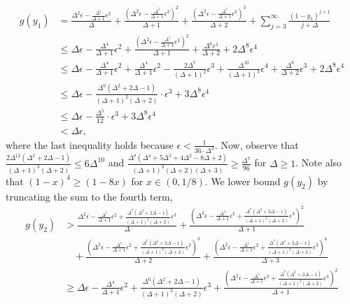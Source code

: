 \documentclass[11pt]{article}
\begin{document}
\begin{appendixproof}
\begin{align*}
g(y_1) &= \frac{\Delta^2\epsilon - \frac{\Delta^5}{\Delta+1}\epsilon^2}{\Delta} + \frac{\left(\Delta^2\epsilon - \frac{\Delta^5}{\Delta+1}\epsilon^2\right)^2}{\Delta+1} + \frac{\left(\Delta^2\epsilon - \frac{\Delta^5}{\Delta+1}\epsilon^2\right)^3}{\Delta+2} + \sum_{j=3}^\infty \frac{(1-y_1)^{j+1}}{j+\Delta}\\ 
&\leq \Delta\epsilon - \frac{\Delta^4}{\Delta+1}\epsilon^2 + \frac{\left(\Delta^2\epsilon - \frac{\Delta^5}{\Delta+1}\epsilon^2\right)^2}{\Delta+1} + \frac{\Delta^6\epsilon^3}{\Delta+2} + 2\Delta^8 \epsilon^4 \\
&\leq \Delta\epsilon - \frac{\Delta^4}{\Delta+1}\epsilon^2 + \frac{\Delta^4}{\Delta+1}\epsilon^2 - \frac{2\Delta^7}{(\Delta+1)^2}\epsilon^3 + \frac{\Delta^{10}}{(\Delta+1)^3} \epsilon^4 + \frac{\Delta^6}{\Delta+2}\epsilon^3
+ 2\Delta^8 \epsilon^4 \\ 
& \leq\Delta\epsilon - \frac{\Delta^6(\Delta^2+2\Delta-1)}{(\Delta+1)^2(\Delta+2)} \cdot \epsilon^3 + 3\Delta^8 \epsilon^4\\
&\leq\Delta\epsilon - \frac{\Delta^5}{12} \cdot \epsilon^3 + 3\Delta^8 \epsilon^4 \\
& < \Delta \epsilon,
\end{align*}
where the last inequality holds because $\epsilon < \frac1{36 \cdot \Delta^3}$.
Now, observe that $\frac{2\Delta^{12}(\Delta^2 + 2\Delta-1)}{(\Delta+1)^3(\Delta+2)} \leq 6\Delta^{10}$ and $\frac{\Delta^8\left( \Delta^4 + 5\Delta^3 + 4\Delta^2-8\Delta+2\right)}{(\Delta+1)^3(\Delta+2)(\Delta+3)} \geq \frac{\Delta^7}{96}$ for $\Delta\geq 1$. Note also that $(1-x)^4 \geq (1-8x)$ for $x\in (0,1/8)$. We lower bound $g(y_2)$ by truncating the sum to the fourth term, 
\begin{align*}
g(y_2) & > \frac{\Delta^2\epsilon - \frac{\Delta^5}{\Delta+1}\epsilon^2 + \frac{\Delta^7(\Delta^2+2\Delta-1)}{(\Delta+1)^2(\Delta+2)}\epsilon^3}{\Delta} + \frac{\left(\Delta^2\epsilon - \frac{\Delta^5}{\Delta+1}\epsilon^2 + \frac{\Delta^7(\Delta^2+2\Delta-1)}{(\Delta+1)^2(\Delta+2)}\epsilon^3\right)^2}{\Delta+1} \\ 
& \quad + \frac{\left(\Delta^2\epsilon - \frac{\Delta^5}{\Delta+1}\epsilon^2 + \frac{\Delta^7(\Delta^2+2\Delta-1)}{(\Delta+1)^2(\Delta+2)}\epsilon^3\right)^3}{\Delta+2} +  \frac{\left(\Delta^2\epsilon - \frac{\Delta^5}{\Delta+1}\epsilon^2 + \frac{\Delta^7(\Delta^2+2\Delta-1)}{(\Delta+1)^2(\Delta+2)}\epsilon^3\right)^4}{\Delta+3}\\
& \geq \Delta\epsilon - \frac{\Delta^4}{\Delta+1}\epsilon^2 + \frac{\Delta^6(\Delta^2+2\Delta-1)}{(\Delta+1)^2(\Delta+2)}\epsilon^3  + \frac{\left(\Delta^2\epsilon - \frac{\Delta^5}{\Delta+1}\epsilon^2 + \frac{\Delta^7(\Delta^2+2\Delta-1)}{(\Delta+1)^2(\Delta+2)}\epsilon^3\right)^2}{\Delta+1} \\

\end{align*}
\end{appendixproof}
\end{document}
